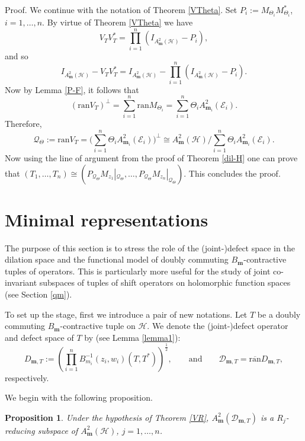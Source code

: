 \documentclass[12pt]{amsart}
\newtheorem{Proposition}[Theorem]{\sc Proposition}
\begin{document}
{\noindent}\textsf{Proof.} We continue with the notation of Theorem
\ref{VTheta}. Set $P_i := M_{\Theta_i} M_{\Theta_i}^*$, $i = 1,
\ldots, n$. By virtue of Theorem \ref{VTheta} we have \[V_T V_T^* =
\prod_{i=1}^n (I_{A^2_{\bm{m}}({\mathcal{H}})} - P_i),\]and so
\[I_{A^2_{\bm{m}}({\mathcal{H}})} - V_T V_T^* = I_{A^2_{\bm{m}}({\mathcal{H}})} -
\prod_{i=1}^n (I_{A^2_{\bm{m}}({\mathcal{H}})} - P_i).\]Now by Lemma \ref{P-F},
it follows that
\[(\mbox{ran} V_T)^\perp = \sum_{i=1}^n \mbox{ran}
M_{\Theta_i} = \sum_{i=1}^n \Theta_i A^2_{{\bm{m}}_i}({\mathcal{E}}_i).\]Therefore,
\[{\mathcal{Q}}_{\Theta} := \mbox{ran} V_T = \Big(\sum_{i=1}^n \Theta_i
A^2_{{\bm{m}}_i}({\mathcal{E}}_i)\Big)^{\perp} \cong A^2_{\bm{m}}({\mathcal{H}})/ \sum_{i=1}^n
\Theta_i A^2_{{\bm{m}}_i}({\mathcal{E}}_i).\]Now using the line of argument from
the proof of Theorem \ref{dil-H} one can prove that $(T_1, \ldots,
T_n) \cong (P_{{\mathcal{Q}}_{\Theta}} M_{z_1}|_{{\mathcal{Q}}_{\Theta}}, \ldots,
P_{{\mathcal{Q}}_{\Theta}} M_{z_n}|_{{\mathcal{Q}}_{\Theta}})$. This concludes the
proof. {\hfill \vrule height6pt width 6pt depth 0pt}

{\setcounter{equation}{0} \section{{Minimal representations}}}

The purpose of this section is to stress the role of the (joint-)defect 
space in the dilation space and the functional model of
doubly commuting $B_{\bm{m}}$-contractive tuples of operators. This is
particularly more useful for the study of joint co-invariant
subspaces of tuples of shift operators on holomorphic function
spaces (see Section \ref{qm}).

To set up the stage, first we introduce a pair of new notations. Let
$T$ be a doubly commuting $B_{\bm{m}}$-contractive tuple on ${\mathcal{H}}$. We
denote the (joint-)defect operator and defect space of $T$ by (see
Lemma \ref{lemma1}):
\[D_{{\bm{m}},T} := (\prod_{i=1}^n B_{m_i}^{-1}(z_i, w_i)(T,
T^*))^\frac{1}{2}, \quad \quad  \mbox{and} \quad\quad {\mathcal{D}}_{{\bm{m}},T} =
\overline{\mbox{ran}} D_{{\bm{m}},T},\]respectively.

We begin with the following proposition.

\begin{Proposition}\label{RD} Under the hypothesis of Theorem
\ref{VR}, $A^2_{\bm{m}}({\mathcal{D}_{\bm{m},T}})$ is a $R_j$-reducing subspace of
$A^2_{\bm{m}}({\mathcal{H}})$, $j = 1, \ldots, n$.
\end{Proposition}
\end{document}
